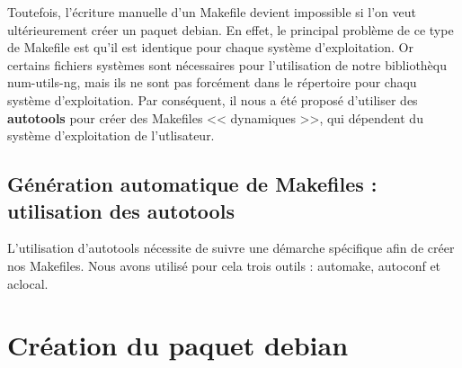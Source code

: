 Toutefois, l'\'ecriture manuelle d'un Makefile devient impossible si l'on veut ult\'erieurement cr\'eer un paquet debian.
En effet, le principal probl\`eme de ce type de Makefile est qu'il est identique pour chaque syst\`eme d'exploitation. Or certains fichiers
syst\`emes sont n\'ecessaires pour l'utilisation de notre biblioth\`equ num-utils-ng, mais ils ne sont pas forc\'ement dans le r\'epertoire pour
chaqu syst\`eme d'exploitation.
\newline 	
Par cons\'equent, il nous a \'et\'e propos\'e d'utiliser des \textbf{autotools} pour cr\'eer des Makefiles << dynamiques >>, qui d\'ependent du syst\`eme
d'exploitation de l'utlisateur.

\subsection{G\'en\'eration automatique de Makefiles : utilisation des autotools}

L'utilisation d'autotools n\'ecessite de suivre une d\'emarche sp\'ecifique afin de cr\'eer nos Makefiles. Nous avons utilis\'e pour
cela trois outils : automake, autoconf et aclocal.

\section{Cr\'eation du paquet debian}